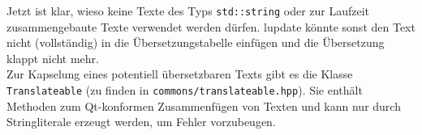 Jetzt ist klar, wieso keine Texte des Typs \texttt{std::string} oder zur Laufzeit zusammengebaute Texte verwendet werden dürfen. lupdate könnte sonst den Text nicht (vollständig) in die Übersetzungstabelle einfügen und die Übersetzung klappt nicht mehr.\\

Zur Kapselung eines potentiell übersetzbaren Texts gibt es die Klasse \texttt{Translateable} (zu finden in \texttt{commons/translateable.hpp}). Sie enthält Methoden zum Qt-konformen Zusammenfügen von Texten und kann nur durch Stringliterale erzeugt werden, um Fehler vorzubeugen.